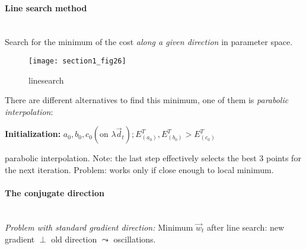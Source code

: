 \paragraph{Line search method}\mbox{}\\
Search for the minimum of the cost \emph{along a given direction} in
parameter space.
\begin{figure}[h]
  \centering
   \texttt{[image: section1\_fig26]}   
  \caption{linesearch}
  \label{fig:linesearch}
\end{figure}
There are different alternatives to find this minimum, one of them is
\emph{parabolic interpolation}:
\begin{algorithm}
   \DontPrintSemicolon
  \textbf{Initialization:} $a_0, b_0, c_0 (\text{on } \lambda \vec{d}_t); E_{(a_0)}^T, E_{(b_0)}^T > E_{(c_0)}^T$\;
    \caption{parabolic interpolation. Note: the last step effectively
      selects the best 3 points for the next iteration. Problem: works
      only if close enough to local minimum.}
\end{algorithm}

\paragraph{The conjugate direction}\mbox{}\\
\emph{Problem with standard gradient direction:} Minimum $\vec{w}_t$
after line search: new gradient $\perp$ old direction $\leadsto$
oscillations. 

